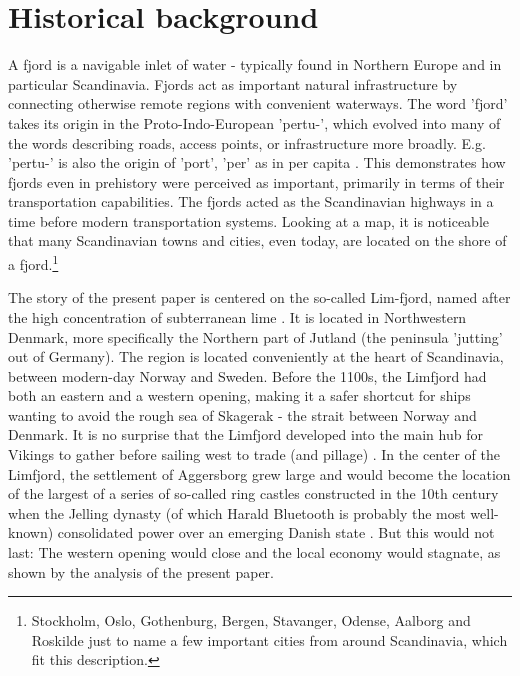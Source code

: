 \documentclass[11pt]{article}
\begin{document}
\section{Historical background}
A fjord is a navigable inlet of water - typically found in Northern Europe and in particular Scandinavia. Fjords act as important natural infrastructure by connecting otherwise remote regions with convenient waterways. The word 'fjord' takes its origin in the Proto-Indo-European 'pertu-', which evolved into many of the words describing roads, access points, or infrastructure more broadly. E.g. 'pertu-' is also the origin of 'port', 'per' as in per capita \citep{EtymFjord}. This demonstrates how fjords even in prehistory were perceived as important, primarily in terms of their transportation capabilities. The fjords acted as the Scandinavian highways in a time before modern transportation systems. Looking at a map, it is noticeable that many Scandinavian towns and cities, even today, are located on the shore of a fjord.\footnote{Stockholm, Oslo, Gothenburg, Bergen, Stavanger, Odense, Aalborg and Roskilde just to name a few important cities from around Scandinavia, which fit this description.}

The story of the present paper is centered on the so-called Lim-fjord, named after the high concentration of subterranean lime \citep{lexlimfjord2017}. It is located in Northwestern Denmark, more specifically the Northern part of Jutland (the peninsula 'jutting' out of Germany). The region is located conveniently at the heart of Scandinavia, between modern-day Norway and Sweden. Before the 1100s, the Limfjord had both an eastern and a western opening, making it a safer shortcut for ships wanting to avoid the rough sea of Skagerak - the strait between Norway and Denmark. It is no surprise that the Limfjord developed into the main hub for Vikings to gather before sailing west to trade (and pillage) \citep{Rasmussen1966}. In the center of the Limfjord, the settlement of Aggersborg grew large and would become the location of the largest of a series of so-called ring castles constructed in the 10th century when the Jelling dynasty (of which Harald Bluetooth is probably the most well-known) consolidated power over an emerging Danish state \citep{pedersen2014}. But this would not last: The western opening would close and the local economy would stagnate, as shown by the analysis of the present paper.
\end{document}

